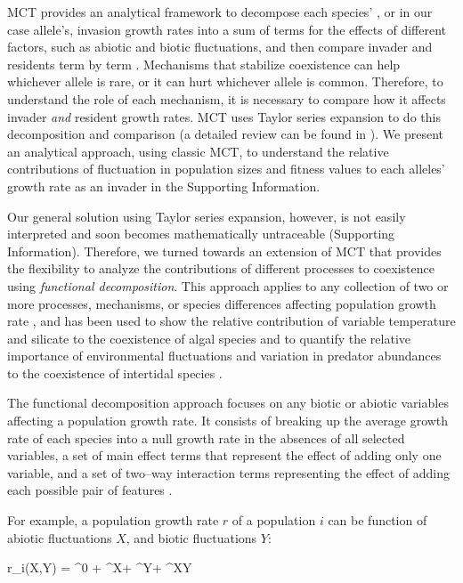 \documentclass[12pt]{article}
\let\oldequation\equation
\let\oldendequation\endequation
\renewenvironment{equation}
  {\linenomathNonumbers\oldequation}
  {\oldendequation\endlinenomath}
\begin{document}
MCT provides an analytical framework to decompose each species' , or in our case allele's, invasion growth rates into a sum of terms for the effects of different factors, such as abiotic and biotic fluctuations, and then compare invader and residents term by term \citep{ellner_expanded_2019}. Mechanisms that stabilize coexistence can help whichever allele is rare, or it can hurt whichever allele is common. Therefore, to understand the role of each mechanism, it is necessary to compare how it affects invader \textit{and} resident growth rates. MCT uses Taylor series expansion to do this decomposition and comparison (a detailed review can be found in \citet{barabas_chessons_2018}). We present an analytical approach, using classic MCT, to understand the relative contributions of fluctuation in population sizes and fitness values to each alleles' growth rate as an invader in the Supporting Information.

Our general solution using Taylor series expansion, however, is not easily interpreted and soon becomes mathematically untraceable (Supporting Information). Therefore, we turned towards an extension of MCT \citep{ellner_expanded_2019} that provides the flexibility to analyze the contributions of different processes to coexistence using \textit{functional decomposition}. This approach applies to any collection of two or more processes, mechanisms, or species differences affecting population growth rate \citep{ ellner2016quantify, ellner_expanded_2019}, and has been used to show the relative contribution of variable temperature and silicate to the coexistence of algal species \citep{ellner2016quantify} and to quantify the relative importance of environmental fluctuations and variation in predator abundances to the coexistence of intertidal species \citep{shoemaker2020}.

The functional decomposition approach focuses on any biotic or abiotic variables affecting a population growth rate. It consists of breaking up the average growth rate of each species into a null growth rate in the absences of all selected variables, a set of main effect terms that represent the effect of adding only one variable, and a set of two--way interaction terms representing the effect of adding each possible pair of features \citep{ellner_expanded_2019}.

For example, a population growth rate $r$ of a population $i$ can be function of abiotic fluctuations $X$, and biotic fluctuations $Y$:

\begin{equation}
   r_{i}(X,Y) = ^{0} + ^{X}+ ^{Y}+ ^{XY}
   \label{functional_decomp}
\end{equation}
\end{document}

